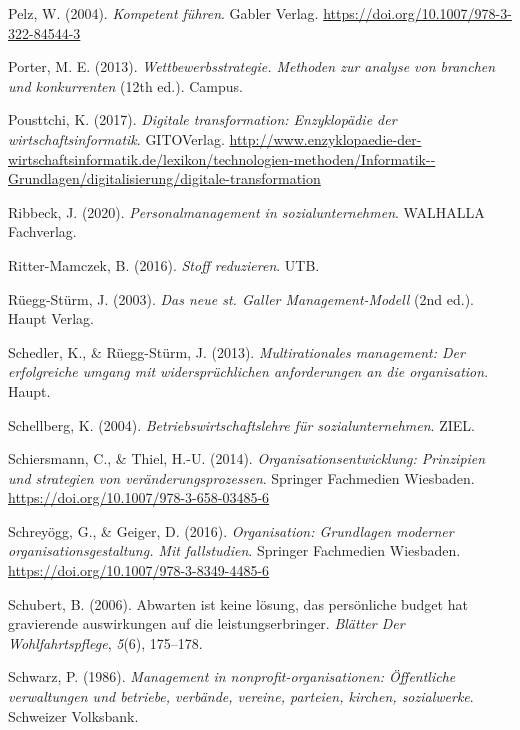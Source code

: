 \documentclass[
  letterpaper,
]{book}
\newlength{\cslhangindent}
\newenvironment{CSLReferences}[2] %
 {\begin{list}{}{%
  \setlength{\itemindent}{0pt}
  \setlength{\leftmargin}{0pt}
  \setlength{\parsep}{0pt}
  \ifodd #1
   \setlength{\leftmargin}{\cslhangindent}
   \setlength{\itemindent}{-1\cslhangindent}
  \fi
  \setlength{\itemsep}{#2\baselineskip}}}
 {\end{list}}
\begin{document}
\begin{CSLReferences}{1}{0}
Pelz, W. (2004). \emph{Kompetent führen}. Gabler Verlag.
\url{https://doi.org/10.1007/978-3-322-84544-3}

Porter, M. E. (2013). \emph{Wettbewerbsstrategie. Methoden zur analyse
von branchen und konkurrenten} (12th ed.). Campus.

Pousttchi, K. (2017). \emph{Digitale transformation: Enzyklopädie der
wirtschaftsinformatik}. GITOVerlag.
\url{http://www.enzyklopaedie-der-wirtschaftsinformatik.de/lexikon/technologien-methoden/Informatik--Grundlagen/digitalisierung/digitale-transformation}

Ribbeck, J. (2020). \emph{Personalmanagement in sozialunternehmen}.
WALHALLA Fachverlag.

Ritter-Mamczek, B. (2016). \emph{Stoff reduzieren}. UTB.

Rüegg-Stürm, J. (2003). \emph{Das neue st. Galler {Management-Modell}}
(2nd ed.). Haupt Verlag.

Schedler, K., \& Rüegg-Stürm, J. (2013). \emph{Multirationales
management: Der erfolgreiche umgang mit widerspr{ü}chlichen
anforderungen an die organisation}. Haupt.

Schellberg, K. (2004). \emph{Betriebswirtschaftslehre für
sozialunternehmen}. ZIEL.

Schiersmann, C., \& Thiel, H.-U. (2014). \emph{Organisationsentwicklung:
Prinzipien und strategien von veränderungsprozessen}. Springer
Fachmedien Wiesbaden. \url{https://doi.org/10.1007/978-3-658-03485-6}

Schreyögg, G., \& Geiger, D. (2016). \emph{Organisation: Grundlagen
moderner organisationsgestaltung. Mit fallstudien}. Springer Fachmedien
Wiesbaden. \url{https://doi.org/10.1007/978-3-8349-4485-6}

Schubert, B. (2006). Abwarten ist keine lösung, das persönliche budget
hat gravierende auswirkungen auf die leistungserbringer. \emph{Blätter
Der Wohlfahrtspflege}, \emph{5}(6), 175--178.

Schwarz, P. (1986). \emph{Management in nonprofit-organisationen:
{Ö}ffentliche verwaltungen und betriebe, verb{ä}nde, vereine, parteien,
kirchen, sozialwerke}. Schweizer Volksbank.


\end{CSLReferences}
\end{document}
